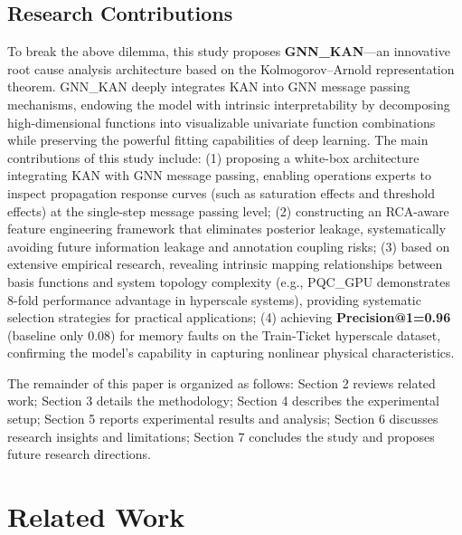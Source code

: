 \documentclass[conference]{IEEEtran}
\begin{document}
\subsection{Research Contributions}

To break the above dilemma, this study proposes \textbf{GNN\_KAN}---an innovative root cause analysis architecture based on the Kolmogorov--Arnold representation theorem. GNN\_KAN deeply integrates KAN into GNN message passing mechanisms, endowing the model with intrinsic interpretability by decomposing high-dimensional functions into visualizable univariate function combinations while preserving the powerful fitting capabilities of deep learning. The main contributions of this study include: (1) proposing a white-box architecture integrating KAN with GNN message passing, enabling operations experts to inspect propagation response curves (such as saturation effects and threshold effects) at the single-step message passing level; (2) constructing an RCA-aware feature engineering framework that eliminates posterior leakage, systematically avoiding future information leakage and annotation coupling risks; (3) based on extensive empirical research, revealing intrinsic mapping relationships between basis functions and system topology complexity (e.g., PQC\_GPU demonstrates 8-fold performance advantage in hyperscale systems), providing systematic selection strategies for practical applications; (4) achieving \textbf{Precision@1=0.96} (baseline only 0.08) for memory faults on the Train-Ticket hyperscale dataset, confirming the model's capability in capturing nonlinear physical characteristics.

The remainder of this paper is organized as follows: Section 2 reviews related work; Section 3 details the methodology; Section 4 describes the experimental setup; Section 5 reports experimental results and analysis; Section 6 discusses research insights and limitations; Section 7 concludes the study and proposes future research directions.

\section{Related Work}
\end{document}
